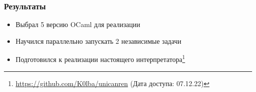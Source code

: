 \documentclass{beamer}
\begin{document}




\begin{frame}
  \frametitle{Результаты}
  \begin{itemize}
  \item Выбрал 5 версию OCaml для реализации
  \item Научился параллельно запускать 2 независимые задачи
  \item Подготовился к реализации настоящего интерпретатора\footnote{\url{https://github.com/K0lba/unicanren} (Дата доступа: 07.12.22)}
  \end{itemize}
  
  
  \end{frame}
  


\appendix
\end{document}
